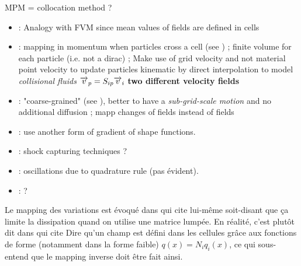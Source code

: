 MPM = collocation method ?
\begin{itemize}
\item \cite{PIC}: Analogy with FVM since mean values of fields are defined in cells
\item \cite{FLIP}: mapping in momentum when particles cross a cell (see \cite{PIC_Nishiguchi}) ; finite volume for each particle (i.e. not a dirac) ; Make use of grid velocity and not material point velocity to update particles kinematic by direct interpolation to model \textit{collisional fluids} ${\overrightarrow{v}}_p=S_{ip}{\overrightarrow{v}}_i$ \textbf{two different velocity fields}
\item \cite{Mass_Flip}: "coarse-grained" (see \cite{Brackbill_PIC}), better to have a \textit{sub-grid-scale motion} and no additional diffusion ; mapp changes of fields instead of fields 
\item \cite{DDMP0}: use another form of gradient of shape functions.
\item \cite{DDMP}: shock capturing techniques ?
  \item \cite[Ch.8?,p.54]{MPMB_BSpline1}: oscillations due to quadrature rule (pas évident).
\item \cite{BsplineMPM}: ?
\end{itemize}
Le mapping des variations est évoqué dans \cite[p.26]{Love} qui cite lui-même \cite{FLIP} soit-disant que ça limite la dissipation quand on utilise une matrice lumpée. En réalité, c'est plutôt dit dans \cite{FLIP0} qui cite \cite{PIC}
Dire qu'un champ est défini dans les cellules grâce aux fonctions de forme (notamment dans la forme faible) $q(x)=N_iq_i(x)$, ce qui sous-entend que le mapping inverse doit être fait ainsi.

